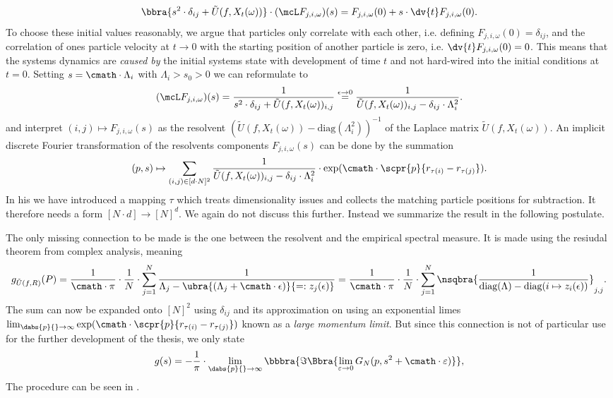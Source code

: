 \[
    \bbra{s^2\cdot\delta_{ij} + \tilde U(f,X_t(\omega))}\cdot (\mcL F_{j,i,\omega})(s) = F_{j,i,\omega}(0) + s\cdot\dv{t}F_{j,i,\omega}(0).
\]
To choose these initial values reasonably, we argue that particles only correlate with each other, i.e. defining $F_{j,i,\omega}(0) = \delta_{ij}$, and the correlation of ones particle velocity at $t\to 0$ with the starting position of another particle is zero, i.e. $\dv{t}F_{j,i,\omega}(0) = 0$. This means that the systems dynamics are \emph{caused by} the initial systems state with development of time $t$ and not hard-wired into the initial conditions at $t = 0$. Setting $s = \cmath\cdot\Lambda_i$ with $\Lambda_i>s_0>0$ we can reformulate to 
\[
    (\mcL F_{j,i,\omega})(s) = \frac{1}{s^2\cdot\delta_{ij} + \tilde U(f,X_t(\omega))_{i,j}} \stackrel{\epsilon\to 0}{=} \frac{1}{\tilde U(f,X_t(\omega))_{i,j} - \delta_{ij}\cdot \Lambda_i^2}.
\]
and interpret $(i,j)\mapsto F_{j,i,\omega}(s)$ as the resolvent $(\tilde U(f,X_t(\omega)) - \text{diag}(\Lambda_i^2))^{-1}$ of the Laplace matrix $\tilde U(f,X_t(\omega))$. An implicit discrete Fourier transformation of the resolvents components $F_{j,i,\omega}(s)$ can be done by the summation 
\[
    (p,s)\mapsto \sum_{(i,j)\in[d\cdot N]^2} \frac{1}{\tilde U(f,X_t(\omega))_{i,j} - \delta_{ij}\cdot \Lambda_i^2} \cdot \exp(\cmath\cdot\scpr{p}{r_{\tau(i)} - r_{\tau(j)}}).
\]
In his we have introduced a mapping $\tau$ which treats dimensionality issues and collects the matching particle positions for subtraction. It therefore needs a form $[N\cdot d]\to [N]^d$. We again do not discuss this further. Instead we summarize the result in the following postulate.

The only missing connection to be made is the one between the resolvent and the empirical spectral measure. It is made using the resiudal theorem from complex analysis, meaning
\[
    g_{\tilde U(f,R)}(P) = \frac{1}{\cmath\cdot\pi}\cdot\frac{1}{N}\cdot\sum_{j=1}^N\frac{1}{\Lambda_j - \ubra{(\Lambda_j + \cmath\cdot\epsilon)}{=:z_j(\epsilon)}} = \frac{1}{\cmath\cdot\pi}\cdot\frac{1}{N}\cdot\sum_{j=1}^N\nsqbra{\frac{1}{\text{diag}(\Lambda) - \text{diag}(i\mapsto z_i(\epsilon))}}_{j,j}.
\]
The sum can now be expanded onto $[N]^2$ using $\delta_{ij}$ and its approximation on using an exponential limes $\lim_{\dabs{p}{}\to\infty}\exp(\cmath\cdot\scpr{p}{r_{\tau(i)} - r_{\tau(j)}})$ known as a \emph{large momentum limit}. But since this connection is not of particular use for the further development of the thesis, we only state
\[
    g(s) = -\frac{1}{\pi}\cdot\lim_{\dabs{p}{}\to\infty}
    \bbbra{
        \Im\Bbra{
            \lim_{\varepsilon\to 0}G_N(p,s^2 + \cmath\cdot\varepsilon)
        }
    },
\]
The procedure can be seen in \cite{skript:NonEqPhy}. 

